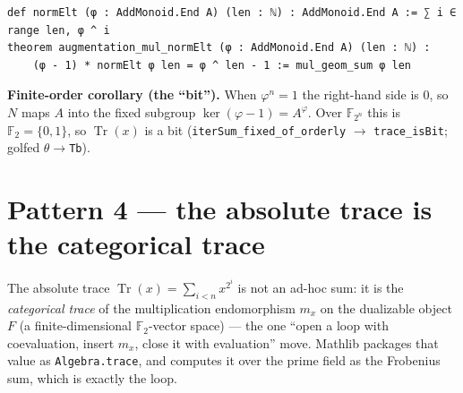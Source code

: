 \documentclass[11pt]{article}
\newcommand{\lc}[1]{\texttt{\small #1}}
\newcommand{\Tr}{\operatorname{Tr}}
\newcommand{\Fq}{\mathbb{F}_{2^{n}}}
\begin{document}
\begin{center}
\end{center}

\begin{lstlisting}
def normElt (φ : AddMonoid.End A) (len : ℕ) : AddMonoid.End A := ∑ i ∈ range len, φ ^ i
theorem augmentation_mul_normElt (φ : AddMonoid.End A) (len : ℕ) :
    (φ - 1) * normElt φ len = φ ^ len - 1 := mul_geom_sum φ len
\end{lstlisting}

\begin{note}
\textbf{Finite-order corollary (the ``bit'').} When $\varphi^{n}=1$ the right-hand
side is $0$, so $N$ maps $A$ into the fixed subgroup $\ker(\varphi-1)=A^{\varphi}$.
Over $\Fq$ this is $\mathbb{F}_2=\{0,1\}$, so $\Tr(x)$ is a bit
(\lc{iterSum\_fixed\_of\_orderly} $\to$ \lc{trace\_isBit}; golfed \lc{$\theta$}$\to$\lc{Tb}).
\end{note}

\section{Pattern 4 --- the absolute trace is the categorical trace}

The absolute trace $\Tr(x)=\sum_{i<n}x^{2^{i}}$ is not an ad-hoc sum: it is the
\emph{categorical trace} of the multiplication endomorphism $m_x$ on the
dualizable object $F$ (a finite-dimensional $\mathbb{F}_2$-vector space) --- the
one ``open a loop with coevaluation, insert $m_x$, close it with evaluation''
move. Mathlib packages that value as \lc{Algebra.trace}, and computes it over the
prime field as the Frobenius sum, which is exactly the loop.

\begin{center}
\end{center}
\end{document}

